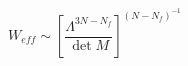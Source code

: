 \begin{equation}
W_{eff} \sim \left[\frac{\Lambda^{3N-N_f}}{\det M}\right]^{(N-N_f)^{-1}}
\end{equation}

